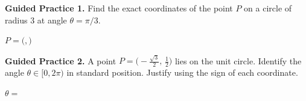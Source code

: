\documentclass[10pt]{article}
\begin{document}
\vspace{0.08in}

\begin{practicebox}
\textbf{Guided Practice 1.} Find the exact coordinates of the point $P$ on a circle of radius 3 at angle $\theta = \pi/3$.

\vspace{0.6in}

$P = \bigl($\underline{\hspace{1.5cm}}$,$\underline{\hspace{1.5cm}}$\bigr)$

\vspace{0.16in}

\textbf{Guided Practice 2.} A point $P = \bigl(-\tfrac{\sqrt{3}}{2},\, \tfrac{1}{2}\bigr)$ lies on the unit circle.
Identify the angle $\theta \in [0, 2\pi)$ in standard position. Justify using the sign of each coordinate.

\vspace{0.7in}

$\theta = $ \underline{\hspace{2cm}}
\end{practicebox}
\end{document}
